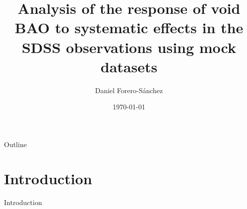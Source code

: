 \documentclass{beamer}
\title[Effects of systematics on void BAO]{Analysis of the response of void BAO to systematic effects in the SDSS observations using mock datasets}
\author{Daniel Forero-S\'anchez\inst{\dag}}
\institute[EPFL] %
{
  \inst{\dag}%
  Laboratory of Astrophysics (LASTRO)\\
  \vspace{5mm}
  École Polytechnyque Fédérale de Lausanne (EPFL)\\
  Lausanne, Suisse
  
  }
\date{\today}
\begin{document}
\begin{frame}
  \titlepage
\end{frame}

\begin{frame}[allowframebreaks]{Outline}
	\begin{multicols}{2}
		\tableofcontents
	\end{multicols}

\end{frame}
\section{Introduction}


\begin{frame}[allowframebreaks]{Introduction}


\end{frame}
\end{document}
